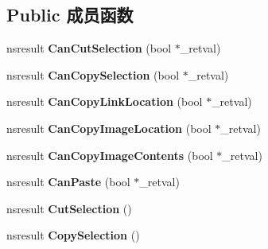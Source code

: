 \subsection*{Public 成员函数}
\begin{DoxyCompactItemize}
\item 
\mbox{\label{interfacens_i_clipboard_commands_a37b882f175278b9185102cccc4d8358d}} 
nsresult {\bfseries Can\+Cut\+Selection} (bool $\ast$\+\_\+retval)
\item 
\mbox{\label{interfacens_i_clipboard_commands_afb82365da4d81efcdcf3da08cf5e80c9}} 
nsresult {\bfseries Can\+Copy\+Selection} (bool $\ast$\+\_\+retval)
\item 
\mbox{\label{interfacens_i_clipboard_commands_ac8aeae1db77da85888c1dce67cec17b5}} 
nsresult {\bfseries Can\+Copy\+Link\+Location} (bool $\ast$\+\_\+retval)
\item 
\mbox{\label{interfacens_i_clipboard_commands_a61646aa9c24da899b3f78fceeb360fce}} 
nsresult {\bfseries Can\+Copy\+Image\+Location} (bool $\ast$\+\_\+retval)
\item 
\mbox{\label{interfacens_i_clipboard_commands_a2f9d497329b2596f3f764fee006d3415}} 
nsresult {\bfseries Can\+Copy\+Image\+Contents} (bool $\ast$\+\_\+retval)
\item 
\mbox{\label{interfacens_i_clipboard_commands_a5c8b104e53a10eeed3e9cc42a9889898}} 
nsresult {\bfseries Can\+Paste} (bool $\ast$\+\_\+retval)
\item 
\mbox{\label{interfacens_i_clipboard_commands_aa7f5164d28384c0c65001aa07e8b802f}} 
nsresult {\bfseries Cut\+Selection} ()
\item 
\mbox{\label{interfacens_i_clipboard_commands_a0ebbddb627b26a279c325ddc82574d7e}} 
nsresult {\bfseries Copy\+Selection} ()
\item 
\mbox{\label{interfacens_i_clipboard_commands_a447ce7199baf09a5540242f76df4b5c8}} 

\end{DoxyCompactItemize}
